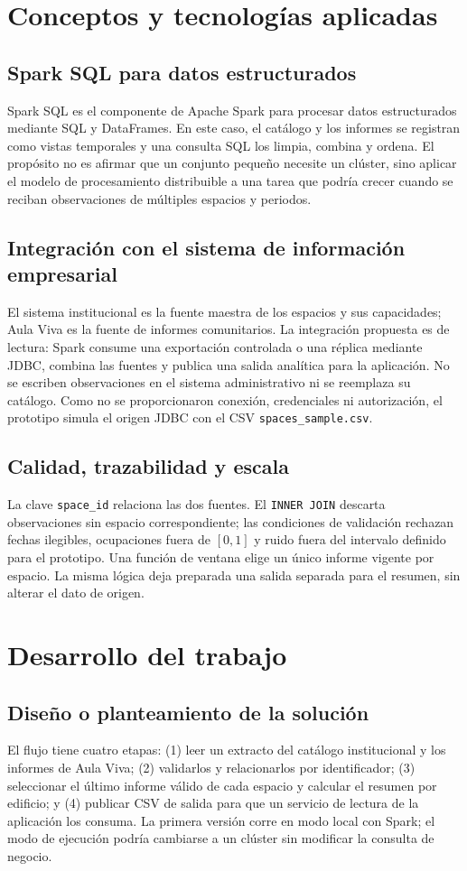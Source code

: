 \documentclass[a4paper,12pt]{article}
\begin{document}
\section{Conceptos y tecnologías aplicadas}
\subsection{Spark SQL para datos estructurados}
Spark SQL es el componente de Apache Spark para procesar datos estructurados mediante SQL y DataFrames. En este caso, el catálogo y los informes se registran como vistas temporales y una consulta SQL los limpia, combina y ordena. El propósito no es afirmar que un conjunto pequeño necesite un clúster, sino aplicar el modelo de procesamiento distribuible a una tarea que podría crecer cuando se reciban observaciones de múltiples espacios y periodos.

\subsection{Integración con el sistema de información empresarial}
El sistema institucional es la fuente maestra de los espacios y sus capacidades; Aula Viva es la fuente de informes comunitarios. La integración propuesta es de lectura: Spark consume una exportación controlada o una réplica mediante JDBC, combina las fuentes y publica una salida analítica para la aplicación. No se escriben observaciones en el sistema administrativo ni se reemplaza su catálogo. Como no se proporcionaron conexión, credenciales ni autorización, el prototipo simula el origen JDBC con el CSV \texttt{spaces\_sample.csv}.

\subsection{Calidad, trazabilidad y escala}
La clave \texttt{space\_id} relaciona las dos fuentes. El \texttt{INNER JOIN} descarta observaciones sin espacio correspondiente; las condiciones de validación rechazan fechas ilegibles, ocupaciones fuera de $[0,1]$ y ruido fuera del intervalo definido para el prototipo. Una función de ventana elige un único informe vigente por espacio. La misma lógica deja preparada una salida separada para el resumen, sin alterar el dato de origen.

\section{Desarrollo del trabajo}
\subsection{Diseño o planteamiento de la solución}
El flujo tiene cuatro etapas: (1) leer un extracto del catálogo institucional y los informes de Aula Viva; (2) validarlos y relacionarlos por identificador; (3) seleccionar el último informe válido de cada espacio y calcular el resumen por edificio; y (4) publicar CSV de salida para que un servicio de lectura de la aplicación los consuma. La primera versión corre en modo local con Spark; el modo de ejecución podría cambiarse a un clúster sin modificar la consulta de negocio.
\end{document}
